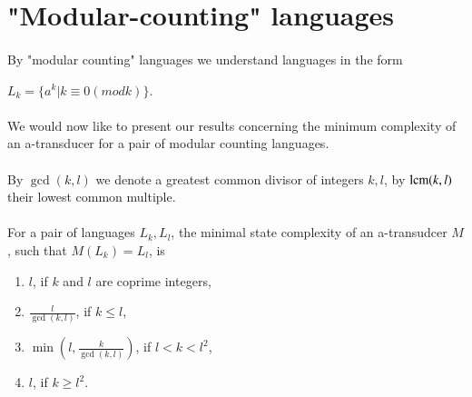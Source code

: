 \section{"Modular-counting" languages}

\paragraph{}
By "modular counting" languages we understand languages in the form \\
\centerline{$L_k = \{ a^k | k \equiv 0 (mod k) \} $.}

\paragraph{}
We would now like to present our results concerning the minimum complexity of an a-transducer for a pair of modular counting languages.

\paragraph{}
\oznacenie By $\gcd(k,l)$ we denote a greatest common divisor of integers $k,l$, by $\operatorname{lcm}(k,l)$ their lowest common multiple.

\paragraph{}
\clema For a pair of languages $L_k, L_l$, the minimal state complexity of an a-transudcer $M$, such that $M(L_k) = L_l$, is 
\begin{enumerate}
\item $l$, if $k$ and $l$ are coprime integers,
\item $\frac{l}{\gcd(k,l)}$, if $k \leq l$,
\item $\min(l,\frac{k}{\gcd(k,l)})$, if $l < k < l^2$,
\item $l$, if $k \geq l^2$.
\end{enumerate}

